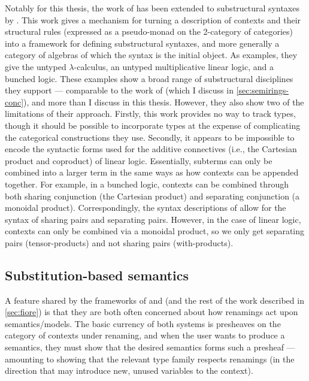 Notably for this thesis, the work of \citet{FPT99} has been extended to
substructural syntaxes by \citet{TP06}.
This work gives a mechanism for turning a description of contexts and their
structural rules (expressed as a pseudo-monad on the 2-category of categories)
into a framework for defining substructural syntaxes, and more generally a
category of algebras of which the syntax is the initial object.
As examples, they give the untyped $\lambda$-calculus, an untyped multiplicative
linear logic, and a bunched logic.
These examples show a broad range of substructural disciplines they support ---
comparable to the work of \citet{LicataSR17} (which I discuss in
\cref{sec:semirings-conc}), and more than I discuss in this thesis.
However, they also show two of the limitations of their approach.
Firstly, this work provides no way to track types, though it should be possible
to incorporate types at the expense of complicating the categorical
constructions they use.
Secondly, it appears to be impossible to encode the syntactic forms used for the
additive connectives (i.e., the Cartesian product and coproduct) of linear
logic.
Essentially, subterms can only be combined into a larger term in the same ways
as how contexts can be appended together.
For example, in a bunched logic, contexts can be combined through both sharing
conjunction (the Cartesian product) and separating conjunction
(a monoidal product).
Correspondingly, the syntax descriptions of \citeauthor{TP06} allow for the
syntax of sharing pairs and separating pairs.
However, in the case of linear logic, contexts can only be combined via a
monoidal product, so we only get separating pairs (tensor-products) and not
sharing pairs (with-products).

\subsection{Substitution-based semantics}

A feature shared by the frameworks of \citet{AACMM21} and \citet{FPT99} (and
the rest of the work described in \cref{sec:fiore}) is that they are both often
concerned about how renamings act upon semantics/models.
The basic currency of both systems is presheaves on the category of contexts
under renaming, and when the user wants to produce a semantics, they must show
that the desired semantics forms such a presheaf --- amounting to showing that
the relevant type family respects renamings (in the direction that may introduce
new, unused variables to the context).

